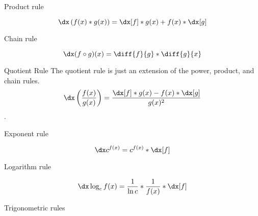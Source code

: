 \begin{psec}{Product rule}

    \begin{equation}\label{eq:derivative prod}
        \dx \left(f(x)*g(x)\right) = \dx[f] *  g(x) + f(x) *
        \dx[g]
    \end{equation}

\end{psec}

\begin{psec}{Chain rule}

    \begin{equation}\label{eq:derivative chain}
        \dx (f \circ g)(x) = \diff{f}{g} * \diff{g}{x}
    \end{equation}

\end{psec}

\begin{psec}{Quotient Rule} The quotient rule is just an extension of the
    power, product, and chain rules.
    \begin{equation}
        \dx \left(\frac{f(x)}{g(x)}\right) = \frac{\dx[f] * g(x) - f(x) * \dx[g]
        }{g(x)^2}
    \end{equation}.

\end{psec}

\begin{psec}{Exponent rule}

    \begin{equation}
        \dx c ^ {f(x)} = c ^ {f(x)} * \dx[f]
    \end{equation}

\end{psec}

\begin{psec}{Logarithm rule}

    \begin{equation}
        \dx \log_c f(x) = \frac{1}{\ln c} * \frac{1}{f(x)} * \dx[f]
    \end{equation}

\end{psec}


\begin{psec}{Trigonometric rules}


\end{psec}
